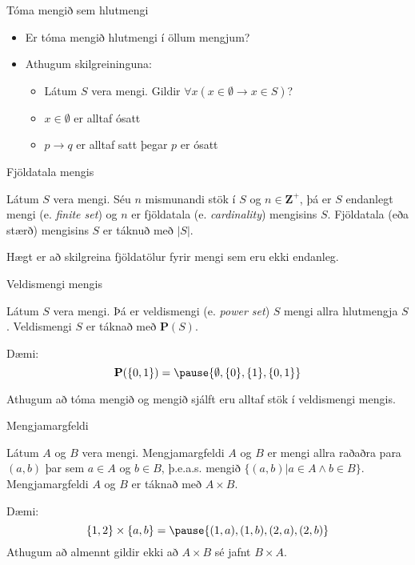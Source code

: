 \documentclass{beamer}
\begin{document}
\begin{frame}{Tóma mengið sem hlutmengi}
\begin{itemize}
 \item Er tóma mengið hlutmengi í öllum mengjum? \pause
 \item Athugum skilgreininguna:
 \begin{itemize}
  \item Látum $S$ vera mengi. Gildir $\forall x (x \in \emptyset \to x \in S)$? \pause
  \item $x \in \emptyset$ er alltaf ósatt \pause
  \item $p \to q$ er alltaf satt þegar $p$ er ósatt
 \end{itemize}
\end{itemize}
\end{frame}

\begin{frame}{Fjöldatala mengis}
\begin{tcolorbox}[title=Fjöldatala]
Látum $S$ vera mengi. Séu $n$ mismunandi stök í $S$ og $n \in \mathbf{Z^+}$, þá er $S$ endanlegt mengi (e. \emph{finite set}) og $n$ er fjöldatala (e. \emph{cardinality}) mengisins $S$. Fjöldatala (eða stærð) mengisins $S$ er táknuð með $|S|$.
\end{tcolorbox}
Hægt er að skilgreina fjöldatölur fyrir mengi sem eru ekki endanleg.
\end{frame}

\begin{frame}{Veldismengi mengis}
\begin{tcolorbox}[title=Veldismengi]
Látum $S$ vera mengi. Þá er veldismengi (e. \emph{power set}) $S$ mengi allra hlutmengja $S$. Veldismengi $S$ er táknað með $\mathbf{P}(S)$.
\end{tcolorbox}
Dæmi: \[\mathbf{P}(\{0, 1\}) = \pause \{\emptyset, \{0\}, \{1\}, \{0, 1\}\}\]

Athugum að tóma mengið og mengið sjálft eru alltaf stök í veldismengi mengis.
\end{frame}

\begin{frame}{Mengjamargfeldi}
\begin{tcolorbox}[title=Mengjamargfeldi]
Látum $A$ og $B$ vera mengi. Mengjamargfeldi $A$ og $B$ er mengi allra raðaðra para $(a, b)$ þar sem $a \in A$ og $b \in B$, þ.e.a.s. mengið $\{(a, b) | a \in A \land b \in B\}$. Mengjamargfeldi $A$ og $B$ er táknað með $A \times B$.
\end{tcolorbox}
Dæmi:
\[
 \{1, 2\} \times \{a, b\} = \pause \{(1, a), (1, b), (2, a), (2, b)\}
\]
Athugum að almennt gildir ekki að $A \times B$ sé jafnt $B \times A$.
\end{frame}
\end{document}
